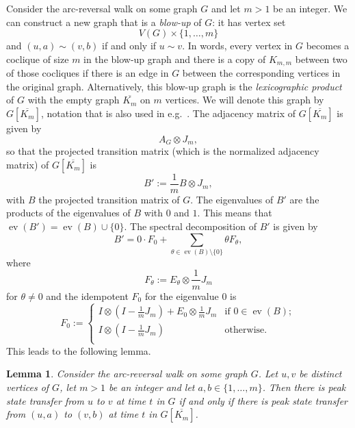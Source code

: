 \documentclass{article}
\newtheorem{lemma}[theorem]{Lemma}
\numberwithin{equation}{section}
\DeclareMathOperator\ev{ev}
\begin{document}
Consider the arc-reversal walk on some graph $G$ and let $m > 1$ be an integer. We can construct a new graph that is a \textsl{blow-up} of $G$: it has vertex set
\[
V(G) \times \{1,\ldots,m\}
\]
and $(u,a)\sim (v,b)$ if and only if $u\sim v$. In words, every vertex in $G$ becomes a coclique of size $m$ in the blow-up graph and there is a  copy of $K_{m,m}$ between two of those cocliques if there is an edge in $G$ between the corresponding vertices in the original graph. Alternatively, this blow-up graph is the \textsl{lexicographic product} of $G$ with the empty graph $\overline{K_m}$ on $m$ vertices. We will denote this graph by $G[\overline{K_m}]$, notation that is also used in e.g.\ \cite{GodRoy2001}. The adjacency matrix of $G[\overline{K_m}]$ is given by
\[
A_G \otimes J_m,
\]
so that the projected transition matrix (which is the normalized adjacency matrix) of $G[\overline{K_m}]$ is
\[
B' := \frac{1}{m} B \otimes J_m,
\]
with $B$ the projected transition matrix of $G$. The eigenvalues of $B'$ are the products of the eigenvalues of $B$ with $0$ and $1$. This means that $\ev(B') = \ev(B) \cup \{0\}$. The spectral decomposition of $B'$ is given by
\[
B' = 0 \cdot F_0 + \sum_{\theta \in \ev(B) \setminus \{0\}} \theta F_\theta,
\]
where
\begin{equation}
\label{eq:nonzero_idempotents_mG}
F_\theta := E_\theta \otimes \frac{1}{m}J_m
\end{equation}
for $\theta \neq 0$ and the idempotent $F_0$ for the eigenvalue $0$ is
\begin{equation}
\label{eq:zero_idempotent_mG}
F_0 :=
\begin{cases}
I \otimes (I - \frac{1}{m}J_m) + E_0 \otimes \frac{1}{m}J_m &\text{if $0 \in \ev(B)$}; \\
I \otimes (I - \frac{1}{m}J_m) &\text{otherwise.} \\
\end{cases}
\end{equation}
This leads to the following lemma.
\begin{lemma}
\label{lem:lex_product_peakST}
Consider the arc-reversal walk on some graph $G$. Let $u,v$ be distinct vertices of $G$, let $m > 1$ be an integer and let $a,b \in \{1,\ldots,m\}$. Then there is peak state transfer from $u$ to $v$ at time $t$ in $G$ if and only if there is peak state transfer from $(u,a)$ to $(v,b)$ at time $t$ in $G[\overline{K_m}]$.
\end{lemma}
\end{document}
